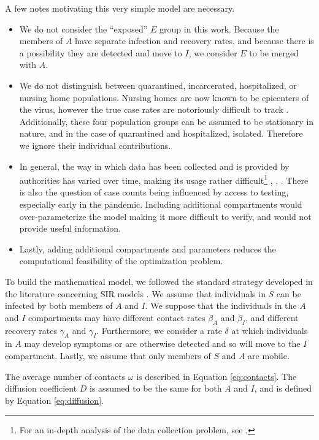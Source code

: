 \documentclass[11pt]{article}
\begin{document}
		A few notes motivating this very simple model are necessary.
		\begin{itemize}
			\item
				We do not consider the ``exposed'' $E$ group in this work.
				Because the members of $A$ have separate infection and recovery rates, and because there is a possibility they are detected and move to $I$, we consider $E$ to be merged with $A$.
			\item
				We do not distinguish between quarantined, incarcerated, hospitalized, or nursing home populations.
				Nursing homes are now known to be epicenters of the virus, however the true case rates are notoriously difficult to track \cite{nursing-homes}.
				Additionally, these four population groups can be assumed to be stationary in nature, and in the case of quarantined and hospitalized, isolated.
				Therefore we ignore their individual contributions.
			\item
				In general, the way in which data has been collected and is provided by authorities has varied over time, making its usage rather difficult\footnote{For an in-depth analysis of the data collection problem, see \cite{sara-soremo}.} \cite{messy-data1}, \cite{messy-data2}, \cite{challenges}.
				There is also the question of case counts being influenced by access to testing, especially early in the pandemic.
				Including additional compartments would over-parameterize the model making it more difficult to verify, and would not provide useful information.
			\item
				Lastly, adding additional compartments and parameters reduces the computational feasibility of the optimization problem.
		\end{itemize}
	
		To build the mathematical model, we followed the standard strategy developed in the literature concerning SIR models \cite{bio-models}.
		We assume that individuals in $S$ can be infected by both members of $A$ and $I$.
		We suppose that the individuals in the $A$ and $I$ compartments may have different contact rates $\beta_A$ and $\beta_I$, and different recovery rates $\gamma_A$ and $\gamma_I$.
		Furthermore, we consider a rate $\delta$ at which individuals in $A$ may develop symptoms or are otherwise detected and so will move to the $I$ compartment.
		Lastly, we assume that only members of $S$ and $A$ are mobile.
		
		The average number of contacts $\omega$ is described in Equation \ref{eq:contacts}.
		The diffusion coefficient $D$ is assumed to be the same for both $A$ and $I$, and is defined by Equation \ref{eq:diffusion}.
		
\end{document}
